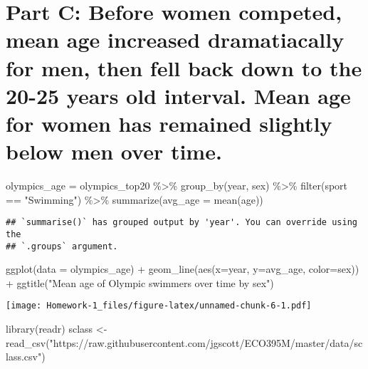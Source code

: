 \documentclass[
]{article}
\newenvironment{Shaded}{\begin{snugshade}}{\end{snugshade}}
\newcommand{\AttributeTok}[1]{\textcolor[rgb]{0.77,0.63,0.00}{#1}}
\newcommand{\FunctionTok}[1]{\textcolor[rgb]{0.00,0.00,0.00}{#1}}
\newcommand{\NormalTok}[1]{#1}
\newcommand{\OtherTok}[1]{\textcolor[rgb]{0.56,0.35,0.01}{#1}}
\newcommand{\SpecialCharTok}[1]{\textcolor[rgb]{0.00,0.00,0.00}{#1}}
\newcommand{\StringTok}[1]{\textcolor[rgb]{0.31,0.60,0.02}{#1}}
\begin{document}
\hypertarget{part-c-before-women-competed-mean-age-increased-dramatiacally-for-men-then-fell-back-down-to-the-20-25-years-old-interval.-mean-age-for-women-has-remained-slightly-below-men-over-time.}{%
\section{Part C: Before women competed, mean age increased dramatiacally
for men, then fell back down to the 20-25 years old interval. Mean age
for women has remained slightly below men over
time.}\label{part-c-before-women-competed-mean-age-increased-dramatiacally-for-men-then-fell-back-down-to-the-20-25-years-old-interval.-mean-age-for-women-has-remained-slightly-below-men-over-time.}}

\begin{Shaded}
\begin{Highlighting}[]
\NormalTok{olympics\_age }\OtherTok{=}\NormalTok{ olympics\_top20 }\SpecialCharTok{\%\textgreater{}\%}
\FunctionTok{group\_by}\NormalTok{(year, sex) }\SpecialCharTok{\%\textgreater{}\%}
\FunctionTok{filter}\NormalTok{(sport }\SpecialCharTok{==} \StringTok{"Swimming"}\NormalTok{) }\SpecialCharTok{\%\textgreater{}\%}
\FunctionTok{summarize}\NormalTok{(}\AttributeTok{avg\_age =} \FunctionTok{mean}\NormalTok{(age))}
\end{Highlighting}
\end{Shaded}

\begin{verbatim}
## `summarise()` has grouped output by 'year'. You can override using the
## `.groups` argument.
\end{verbatim}

\begin{Shaded}
\begin{Highlighting}[]
\FunctionTok{ggplot}\NormalTok{(}\AttributeTok{data =}\NormalTok{ olympics\_age) }\SpecialCharTok{+} \FunctionTok{geom\_line}\NormalTok{(}\FunctionTok{aes}\NormalTok{(}\AttributeTok{x=}\NormalTok{year, }\AttributeTok{y=}\NormalTok{avg\_age, }\AttributeTok{color=}\NormalTok{sex)) }\SpecialCharTok{+} \FunctionTok{ggtitle}\NormalTok{(}\StringTok{"Mean age of Olympic swimmers over time by sex"}\NormalTok{)}
\end{Highlighting}
\end{Shaded}

\texttt{[image: Homework-1\_files/figure-latex/unnamed-chunk-6-1.pdf]}

\begin{Shaded}
\begin{Highlighting}[]
\FunctionTok{library}\NormalTok{(readr)}
\NormalTok{sclass }\OtherTok{\textless{}{-}} \FunctionTok{read\_csv}\NormalTok{(}\StringTok{"https://raw.githubusercontent.com/jgscott/ECO395M/master/data/sclass.csv"}\NormalTok{)}
\end{Highlighting}
\end{Shaded}
\end{document}
